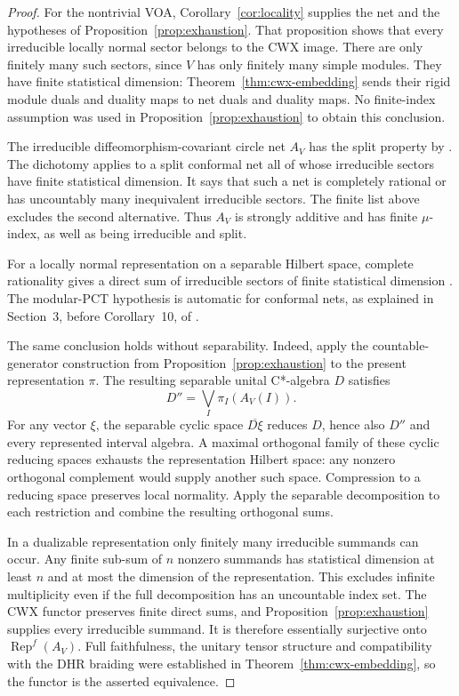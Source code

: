 \begin{proof}
For the nontrivial VOA, Corollary~\ref{cor:locality} supplies the net and
the hypotheses of Proposition~\ref{prop:exhaustion}.  That proposition
shows that every irreducible locally normal sector belongs to the CWX
image.  There are only finitely many such sectors, since \(V\) has only
finitely many simple modules.  They have finite statistical dimension:
Theorem~\ref{thm:cwx-embedding} sends their rigid module duals and duality
maps to net duals and duality maps.  No finite-index assumption was used
in Proposition~\ref{prop:exhaustion} to obtain this conclusion.

The irreducible diffeomorphism-covariant circle net \(A_V\) has the split
property by \cite[Theorem~5.4]{MTW}.  The dichotomy
\cite[Theorem~4.9]{LongoXu} applies to a split conformal net all of whose
irreducible sectors have finite statistical dimension.  It says that such
a net is completely rational or has uncountably many inequivalent
irreducible sectors.  The finite list above excludes the second
alternative.  Thus \(A_V\) is strongly additive and has finite
\(\mu\)-index, as well as being irreducible and split.

For a locally normal representation on a separable Hilbert space,
complete rationality gives a direct sum of irreducible sectors of finite
statistical dimension \cite[Corollary~39 and the proof of Corollary~40; Appendix~B]{KLM}. The modular-PCT hypothesis
is automatic for conformal nets, as explained in Section~3, before
Corollary~10, of \cite{KLM}.

The same conclusion holds without separability. Indeed, apply the
countable-generator construction from Proposition~\ref{prop:exhaustion}
to the present representation $\pi$. The resulting separable unital
C*-algebra $D$ satisfies
\[
 D''=\bigvee_I\pi_I(A_V(I)).
\]
For any vector $\xi$, the separable cyclic space $\overline{D\xi}$
reduces $D$, hence also $D''$ and every represented interval algebra.
A maximal orthogonal family of these cyclic reducing spaces exhausts
the representation Hilbert space: any nonzero orthogonal complement
would supply another such space. Compression to a reducing space
preserves local normality. Apply the separable decomposition
\cite[Corollary~39 and the proof of Corollary~40; Appendix~B]{KLM}
to each restriction and combine the resulting orthogonal sums.

In a dualizable representation only finitely many irreducible summands
can occur. Any finite sub-sum of $n$ nonzero summands has statistical
dimension at least $n$ and at most the dimension of the representation.
This excludes infinite multiplicity even if the full decomposition has
an uncountable index set.  The CWX functor preserves finite direct sums,
and Proposition~\ref{prop:exhaustion} supplies every irreducible summand.
It is therefore essentially surjective onto
\(\operatorname{Rep}^{f}(A_V)\).  Full faithfulness, the unitary tensor
structure and compatibility with the DHR braiding were established in
Theorem~\ref{thm:cwx-embedding}, so the functor is the asserted
equivalence.


\end{proof}
